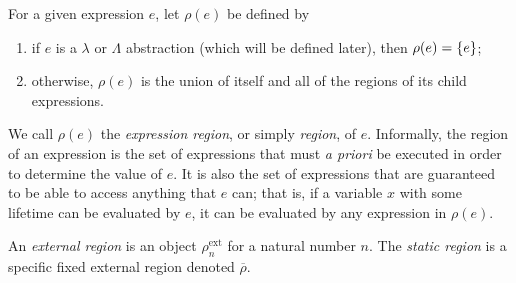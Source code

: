 \documentclass[UKenglish, 11pt, a4paper, parskip=half]{scrbook}
\newcommand{\lstatic}{\ensuremath{\overline\rho}}
\begin{document}
\begin{defn}
  For a given expression \( e \), let \( \rho(e) \) be defined by
  \begin{enumerate}
    \item if \( e \) is a \( \lambda \) or \( \Lambda \) abstraction (which will be defined later), then \( \rho(e) = \qty{e} \);
    \item otherwise, \( \rho(e) \) is the union of itself and all of the regions of its child expressions.
  \end{enumerate}
  We call \( \rho(e) \) the \textit{expression region}, or simply \textit{region}, of \( e \).
  Informally, the region of an expression is the set of expressions that must \textit{a priori} be executed in order to determine the value of \( e \).
  It is also the set of expressions that are guaranteed to be able to access anything that \( e \) can; that is, if a variable \( x \) with some lifetime can be evaluated by \( e \), it can be evaluated by any expression in \( \rho(e) \).
\end{defn}
\begin{defn}
  An \textit{external region} is an object \( \rho_n^{\mathrm{ext}} \) for a natural number \( n \).
  The \textit{static region} is a specific fixed external region denoted \( \lstatic \).
\end{defn}
\end{document}
